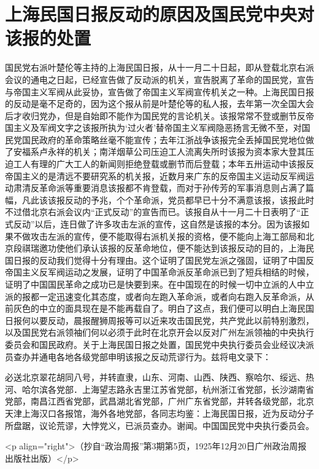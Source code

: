 \section[上海民国日报反动的原因及国民党中央对该报的处置（一九二五年十二月二十日）]{上海民国日报反动的原因及国民党中央对该报的处置}


国民党右派叶楚伦等主持的上海民国日报，从十一月二十日起，即从登载北京右派会议的通电之日起，已经宣告做了反动派的机关，宣告脱离了革命的国民党，宣告与帝国主义军阀从此妥协，宣告做了帝国主义军阀宣传机关之一种。上海民国日报的反动是毫不足奇的，因为这个报从前是叶楚伦等的私人报，去年第一次全国大会后才收归党办，但是自始即不能作为国民党的言论机关。该报常常不登或删节反帝国主义及军阀文字之该报所执为‘过火者’替帝国主义军阀隐恶扬言无微不至，对国民党国民政府的革命策略丝毫不能宣传；去年江浙战争该报完全丢掉国民党地位做了安福系卢永祥的机关；南洋烟草公司压迫工人流离失所时该报为资本家大登其压迫工人有理的广大工人的新闻则拒绝登载或删节而后登载；本年五卅运动中该报反帝国主义的是清远不要研究系的机关报，近数月来广东的反帝国主义运动反军阀运动肃清反革命派等重要消息该报都不肯登载，而对于孙传芳的军事消息则占满了篇幅，凡此该该报反动的予兆，个个革命派，党员都早已十分不满意该报，该报此时不过借北京右派会议内“正式反动”的宣告而已。该报自从十一月二十日表明了“正式反动”以后，连日做了许多攻击左派的宣传，这自然是该报的本分。因为该报如果不做攻击左派的宣传，便不能取得右派机关报的资格，便不能向上海工部局和北京段祺瑞邀功使他们承认该报的反革命地位，便不能达到该报反动的目的，上海民国日报的反动我们觉得十分有理由。这个证明了国民党左派之强固，证明了中国反帝国主义反军阀运动之发展，证明了中国革命派反革命派已到了短兵相结的时候，证明了中国国民革命之成功已是快要到来。在中国现在的时候一切中立派的人中立派的报都一定迅速变化其态度，或者向左跑入革命派，或者向右跑入反革命派，从前灰色的中立的面具现在是不能再载自了。明白了这点，我们便可以明白上海民国日报何以要反动，晨报醒狮周报等可以近来攻击国民党，共产党此以前特别激烈，以及国民党右派领袖们何以必须于此时在北京开会以反对广州左派领袖的中央执行委员会和国民政府。关于上海民国日报之处置，国民党中央执行委员会业经议决派员查办并通电各地各级党部申明该报之反动荒谬行为。兹将电文录下：

必送北京翠花胡同八号，并转直隶，山东、河南、山西、陕西、察哈尔、绥远、热河、哈尔滨各党部．上海望志路永吉里江苏省党部，杭州浙江省党部，长沙湖南省党部，南昌江西省党部，武昌湖北省党部，广州广东省党部，并转各级党部，北京天津上海汉口各报馆，海外各地党部，各同志均鉴：上海民国日报，近为反动分子所盘踞，议论荒谬，大悖党义，已派员查办。谢闻。中国国民党中央执行委员会。

<p align="right">（抄自“政治周报”第3期第5页，1925年12月20日广州政治周报出版社出版）</p>


